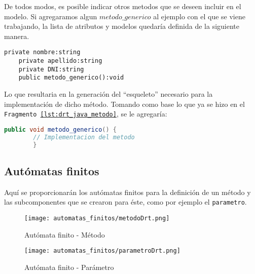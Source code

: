 De todos modos, es posible indicar otros metodos que se deseen incluir en el
modelo. Si agregaramos algun $metodo\_generico$ al ejemplo con el que se viene
trabajando, la lista de atributos y modelos quedaría definida de la siguiente
manera.

\begin{lstlisting}[caption={Director - Declaración de Método}, label=lst:drt_java_modelo_metodo_generico]
	private nombre:string
	private apellido:string
	private DNI:string
	public metodo_generico():void
\end{lstlisting}

Lo que resultaria en la generación del ``esqueleto'' necesario para la
implementación de dicho método. Tomando como base lo que ya se hizo en
el \texttt{Fragmento \ref{lst:drt_java_metodo}}, se le agregaría:

\begin{lstlisting}[caption={Java - Generación metodo\_generico agregado en
\texttt{Fragmento \ref{lst:drt_java_modelo_metodo_generico}}}, language=Java, basicstyle=\footnotesize\ttfamily]
  public void metodo_generico() {
		// Implementacion del metodo
		}
\end{lstlisting}


\subsection*{Autómatas finitos}
\label{sub:metodo_af}

Aquí se proporcionarán los autómatas finitos para la definición de un método y
las subcomponentes que se crearon para éste, como por ejemplo el
\texttt{parametro}.

\begin{figure}[H]
	\centering
	\texttt{[image: automatas\_finitos/metodoDrt.png]}
	\caption{Autómata finito - Método}
	\label{fig:metodo_af}
\end{figure}

\begin{figure}[H]
	\centering
	\texttt{[image: automatas\_finitos/parametroDrt.png]}
	\caption{Autómata finito - Parámetro}
	\label{fig:metodo_parametro_af}
\end{figure}


